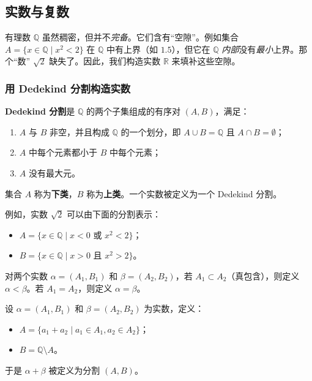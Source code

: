 \subsection{实数与复数}
有理数 $\mathbb{Q}$ 虽然稠密，但并不\emph{完备}。它们含有“空隙”。例如集合 $A=\{x\in \mathbb{Q}\mid x^2<2\}$ 在 $\mathbb{Q}$ 中有上界（如 $1.5$），但它在 $\mathbb{Q}$ \emph{内部}没有\emph{最小}上界。那个“数” $\sqrt{2}$ 缺失了。因此，我们构造实数 $\mathbb{R}$ 来填补这些空隙。

\subsubsection{用 Dedekind 分割构造实数}

\begin{definition}[Dedekind 分割]
\textbf{Dedekind 分割}是 $\mathbb{Q}$ 的两个子集组成的有序对 $(A,B)$，满足：
\begin{enumerate}
    \item $A$ 与 $B$ 非空，并且构成 $\mathbb{Q}$ 的一个划分，即 $A\cup B=\mathbb{Q}$ 且 $A\cap B=\emptyset$；
    \item $A$ 中每个元素都小于 $B$ 中每个元素；
    \item $A$ 没有最大元。
\end{enumerate}
集合 $A$ 称为\textbf{下类}，$B$ 称为\textbf{上类}。一个实数被定义为一个 Dedekind 分割。
\end{definition}

例如，实数 $\sqrt{2}$ 可以由下面的分割表示：
\begin{itemize}
    \item $A=\{x\in \mathbb{Q}\mid x<0\text{ 或 }x^2<2\}$；
    \item $B=\{x\in \mathbb{Q}\mid x>0\text{ 且 }x^2>2\}$。
\end{itemize}

\begin{definition}[实数上的序]
对两个实数 $\alpha=(A_1,B_1)$ 和 $\beta=(A_2,B_2)$，若 $A_1\subset A_2$（真包含），则定义 $\alpha<\beta$。若 $A_1=A_2$，则定义 $\alpha=\beta$。
\end{definition}

\begin{definition}[实数加法]
设 $\alpha=(A_1,B_1)$ 和 $\beta=(A_2,B_2)$ 为实数，定义：
\begin{itemize}
    \item $A=\{a_1+a_2\mid a_1\in A_1, a_2\in A_2\}$；
    \item $B=\mathbb{Q}\setminus A$。
\end{itemize}
于是 $\alpha+\beta$ 被定义为分割 $(A,B)$。
\end{definition}

